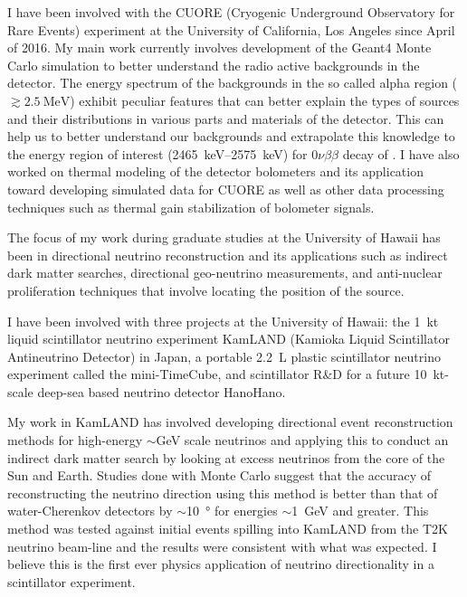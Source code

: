 \documentclass[a4paper,10pt]{article} %
\begin{document}
I have been involved with the CUORE (Cryogenic Underground Observatory for Rare
Events) experiment at the University of California, Los Angeles since April of
2016. My main work currently involves development of the Geant4 Monte Carlo
simulation to better understand the radio active backgrounds in the detector.
The energy spectrum of the backgrounds in the so called alpha region ($\gtrsim
\SI{2.5}{\mega\electronvolt}$) exhibit peculiar features that can better
explain the types of sources and their distributions in various parts and
materials of the detector. This can help us to better understand our
backgrounds and extrapolate this knowledge to the energy region of interest
(\SIrange{2465}{2575}{\kilo\electronvolt}) for $0\nu\beta\beta$ decay of
. I have also worked on thermal modeling of the detector
bolometers and its application toward developing simulated data for CUORE as
well as other data processing techniques such as thermal gain stabilization of
bolometer signals.

The focus of my work during graduate studies at the University of Hawaii has been in
directional neutrino reconstruction and its applications such as indirect dark
matter searches, directional geo-neutrino measurements, and anti-nuclear
proliferation techniques that involve locating the position of the source.

I have been involved with three projects at the University of Hawaii: the
\SI{1}{\kilo\tonne} liquid scintillator neutrino experiment KamLAND (Kamioka
Liquid Scintillator Antineutrino Detector) in Japan, a portable
\SI{2.2}{\liter} plastic scintillator neutrino experiment called the
mini-TimeCube, and scintillator R\&D for a future \SI{10}{\kilo\tonne}-scale
deep-sea based neutrino detector HanoHano.

My work in KamLAND has involved developing directional event reconstruction
methods for high-energy $\sim$\si{\giga\electronvolt} scale neutrinos and
applying this to conduct an indirect dark matter search by looking at excess
neutrinos from the core of the Sun and Earth. Studies done with Monte Carlo
suggest that the accuracy of reconstructing the neutrino direction using this
method is better than that of water-Cherenkov detectors by
$\sim$\SI{10}{\degree} for energies $\sim$\SI{1}{\giga\electronvolt} and
greater. This method was tested against initial events spilling into KamLAND
from the T2K neutrino beam-line and the results were consistent with what was
expected. I believe this is the first ever physics application of neutrino
directionality in a scintillator experiment.
\end{document}
